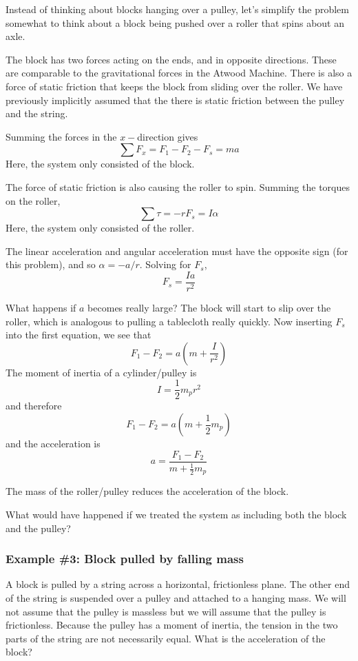 Instead of thinking about blocks hanging over a pulley, let's simplify the problem somewhat to think about a block being pushed over a roller that spins about an axle.

\vspace{5cm}

The block has two forces acting on the ends, and in opposite directions. These are comparable to the gravitational forces in the Atwood Machine. There is also a force of static friction that keeps the block from sliding over the roller. We have previously implicitly assumed that the there is static friction between the pulley and the string.

Summing the forces in the $x-$direction gives
$$\sum F_x = F_1-F_2-F_s = ma$$
Here, the system only consisted of the block.

The force of static friction is also causing the roller to spin. Summing the torques on the roller,
$$\sum \tau = -rF_s = I\alpha$$
Here, the system only consisted of the roller.

The linear acceleration and angular acceleration must have the opposite sign (for this problem), and so $\alpha = -a/r$. Solving for $F_s$,
$$F_s = \frac{Ia}{r^2}$$

What happens if $a$ becomes really large? The block will start to slip over the roller, which is analogous to pulling a tablecloth really quickly. Now inserting $F_s$ into the first equation, we see that
$$F_1-F_2=a\left(m+\frac{I}{r^2}\right)$$
The moment of inertia of a cylinder/pulley is
$$I=\frac{1}{2}m_pr^2$$
and therefore
$$F_1-F_2=a\left(m+\frac{1}{2}m_p\right)$$
and the acceleration is
$$a=\frac{F_1-F_2}{m+\frac{1}{2}m_p}$$

The mass of the roller/pulley reduces the acceleration of the block.

What would have happened if we treated the system as including both the block and the pulley?

\subsubsection{Example \#3: Block pulled by falling mass}
A block is pulled by a string across a horizontal, frictionless plane. The other end of the string is suspended over a pulley and attached to a hanging mass. We will not assume that the pulley is massless but we will assume that the pulley is frictionless. Because the pulley has a moment of inertia, the tension in the two parts of the string are not necessarily equal. What is the acceleration of the block?

